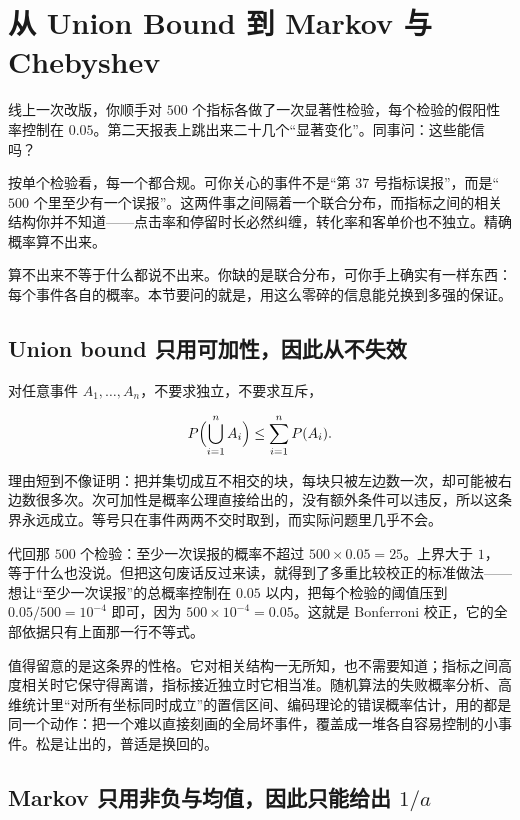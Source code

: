 \section{从 Union Bound 到 Markov 与 Chebyshev}
\label{sec:05-Probability/07-Transforms-and-Bounds/02}

线上一次改版，你顺手对 \(500\) 个指标各做了一次显著性检验，每个检验的假阳性率控制在 \(0.05\)。第二天报表上跳出来二十几个``显著变化''。同事问：这些能信吗？

按单个检验看，每一个都合规。可你关心的事件不是``第 \(37\) 号指标误报''，而是``\(500\) 个里至少有一个误报''。这两件事之间隔着一个联合分布，而指标之间的相关结构你并不知道——点击率和停留时长必然纠缠，转化率和客单价也不独立。精确概率算不出来。

算不出来不等于什么都说不出来。你缺的是联合分布，可你手上确实有一样东西：每个事件各自的概率。本节要问的就是，用这么零碎的信息能兑换到多强的保证。

\subsection{Union bound 只用可加性，因此从不失效}

对任意事件 \(A_1,\ldots,A_n\)，不要求独立，不要求互斥，

\[
P\Bigl(\bigcup_{i=1}^nA_i\Bigr)\le\sum_{i=1}^nP(A_i).
\]

理由短到不像证明：把并集切成互不相交的块，每块只被左边数一次，却可能被右边数很多次。次可加性是概率公理直接给出的，没有额外条件可以违反，所以这条界永远成立。等号只在事件两两不交时取到，而实际问题里几乎不会。

代回那 \(500\) 个检验：至少一次误报的概率不超过 \(500\times0.05=25\)。上界大于 \(1\)，等于什么也没说。但把这句废话反过来读，就得到了多重比较校正的标准做法——想让``至少一次误报''的总概率控制在 \(0.05\) 以内，把每个检验的阈值压到 \(0.05/500=10^{-4}\) 即可，因为 \(500\times10^{-4}=0.05\)。这就是 Bonferroni 校正，它的全部依据只有上面那一行不等式。

值得留意的是这条界的性格。它对相关结构一无所知，也不需要知道；指标之间高度相关时它保守得离谱，指标接近独立时它相当准。随机算法的失败概率分析、高维统计里``对所有坐标同时成立''的置信区间、编码理论的错误概率估计，用的都是同一个动作：把一个难以直接刻画的全局坏事件，覆盖成一堆各自容易控制的小事件。松是让出的，普适是换回的。

\subsection{Markov 只用非负与均值，因此只能给出 \texorpdfstring{\(1/a\)}{1/a}}

